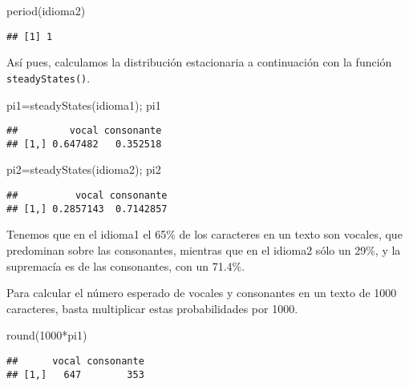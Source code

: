 \documentclass[
]{book}
\newenvironment{Shaded}{\begin{snugshade}}{\end{snugshade}}
\newcommand{\DecValTok}[1]{\textcolor[rgb]{0.00,0.00,0.81}{#1}}
\newcommand{\FunctionTok}[1]{\textcolor[rgb]{0.00,0.00,0.00}{#1}}
\newcommand{\NormalTok}[1]{#1}
\newcommand{\OtherTok}[1]{\textcolor[rgb]{0.56,0.35,0.01}{#1}}
\newcommand{\SpecialCharTok}[1]{\textcolor[rgb]{0.00,0.00,0.00}{#1}}
\theoremstyle{definition}
\theoremstyle{definition}
\theoremstyle{definition}
\theoremstyle{definition}
\theoremstyle{remark}
\begin{document}
\begin{Shaded}
\begin{Highlighting}[]
\FunctionTok{period}\NormalTok{(idioma2)}
\end{Highlighting}
\end{Shaded}

\begin{verbatim}
## [1] 1
\end{verbatim}

Así pues, calculamos la distribución estacionaria a continuación con la función \texttt{steadyStates()}.

\begin{Shaded}
\begin{Highlighting}[]
\NormalTok{pi1}\OtherTok{=}\FunctionTok{steadyStates}\NormalTok{(idioma1); pi1}
\end{Highlighting}
\end{Shaded}

\begin{verbatim}
##         vocal consonante
## [1,] 0.647482   0.352518
\end{verbatim}

\begin{Shaded}
\begin{Highlighting}[]
\NormalTok{pi2}\OtherTok{=}\FunctionTok{steadyStates}\NormalTok{(idioma2); pi2}
\end{Highlighting}
\end{Shaded}

\begin{verbatim}
##          vocal consonante
## [1,] 0.2857143  0.7142857
\end{verbatim}

Tenemos que en el idioma1 el 65\% de los caracteres en un texto son vocales, que predominan sobre las consonantes, mientras que en el idioma2 sólo un 29\%, y la supremacía es de las consonantes, con un 71.4\%.

Para calcular el número esperado de vocales y consonantes en un texto de 1000 caracteres, basta multiplicar estas probabilidades por 1000.

\begin{Shaded}
\begin{Highlighting}[]
\FunctionTok{round}\NormalTok{(}\DecValTok{1000}\SpecialCharTok{*}\NormalTok{pi1)}
\end{Highlighting}
\end{Shaded}

\begin{verbatim}
##      vocal consonante
## [1,]   647        353
\end{verbatim}
\end{document}
